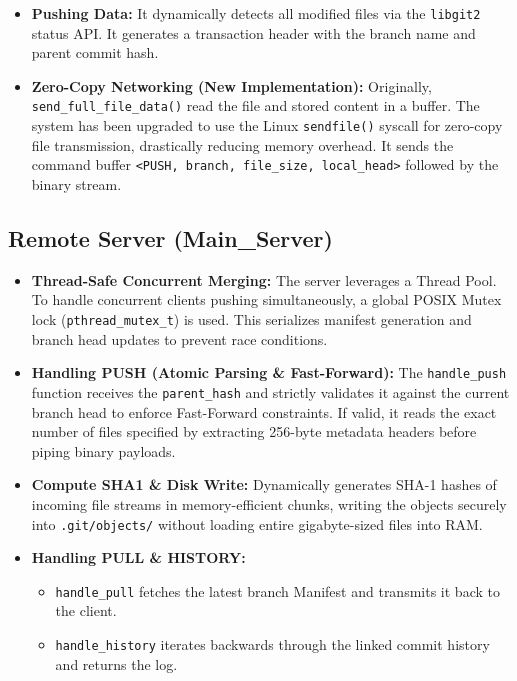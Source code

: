 \documentclass[12pt,a4paper]{article}
\begin{document}
\begin{itemize}
    \textbf{3. Committing Changes (\texttt{GIT\_COMMIT})}
    \begin{lstlisting}[language=C]
// Write the index as a tree
git_index_write_tree(&id, idx);
// Lookup the tree object from the repository
git_tree_lookup(&tree, repo, &id);

// Prompts user for email and password
signature_define();

// Creates a new commit locally
git_commit_create_v(&cmoid, repo, "HEAD", &sign, &sign, NULL, msg, tree, parent_count);
    \end{lstlisting}
    \item \textbf{Pushing Data:} It dynamically detects all modified files via the \texttt{libgit2} status API. It generates a transaction header with the branch name and parent commit hash.
    \item \textbf{Zero-Copy Networking (New Implementation):} Originally, \texttt{send\_full\_file\_data()} read the file and stored content in a buffer. The system has been upgraded to use the Linux \texttt{sendfile()} syscall for zero-copy file transmission, drastically reducing memory overhead. It sends the command buffer \texttt{<PUSH, branch, file\_size, local\_head>} followed by the binary stream.
\end{itemize}

\subsection{Remote Server (Main\_Server)}
\begin{itemize}
    \item \textbf{Thread-Safe Concurrent Merging:} The server leverages a Thread Pool. To handle concurrent clients pushing simultaneously, a global POSIX Mutex lock (\texttt{pthread\_mutex\_t}) is used. This serializes manifest generation and branch head updates to prevent race conditions.
    \item \textbf{Handling PUSH (Atomic Parsing \& Fast-Forward):} The \texttt{handle\_push} function receives the \texttt{parent\_hash} and strictly validates it against the current branch head to enforce Fast-Forward constraints. If valid, it reads the exact number of files specified by extracting 256-byte metadata headers before piping binary payloads.
    \item \textbf{Compute SHA1 \& Disk Write:} Dynamically generates SHA-1 hashes of incoming file streams in memory-efficient chunks, writing the objects securely into \texttt{.git/objects/} without loading entire gigabyte-sized files into RAM.
    \item \textbf{Handling PULL \& HISTORY:} 
    \begin{itemize}
        \item \texttt{handle\_pull} fetches the latest branch Manifest and transmits it back to the client.
        \item \texttt{handle\_history} iterates backwards through the linked commit history and returns the log.
    \end{itemize}
\end{itemize}
\end{document}
